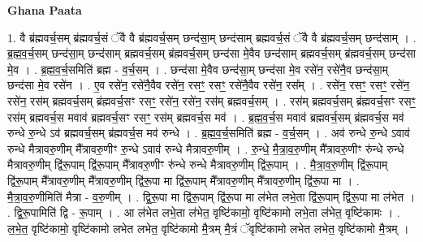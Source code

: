 \documentclass[17pt]{extarticle}
\begin{document}
\textbf{Ghana Paata } \newline

1. वै ब्र॑ह्मवर्च॒सम् ब्र॑ह्मवर्च॒सं ॅवै वै ब्र॑ह्मवर्च॒सम् छन्द॑सा॒म् छन्द॑साम् ब्रह्मवर्च॒सं ॅवै वै ब्र॑ह्मवर्च॒सम् छन्द॑साम् । . ब्र॒ह्म॒व॒र्च॒सम् छन्द॑सा॒म् छन्द॑साम् ब्रह्मवर्च॒सम् ब्र॑ह्मवर्च॒सम् छन्द॑सा मे॒वैव छन्द॑साम् ब्रह्मवर्च॒सम् ब्र॑ह्मवर्च॒सम् छन्द॑सा मे॒व । . ब्र॒ह्म॒व॒र्च॒समिति॑ ब्रह्म - व॒र्च॒सम् । . छन्द॑सा मे॒वैव छन्द॑सा॒म् छन्द॑सा मे॒व रसे॑न॒ रसे॑नै॒व छन्द॑सा॒म् छन्द॑सा मे॒व रसे॑न । . ए॒व रसे॑न॒ रसे॑नै॒वैव रसे॑न॒ रसꣳ॒॒ रसꣳ॒॒ रसे॑नै॒वैव रसे॑न॒ रस᳚म् । . रसे॑न॒ रसꣳ॒॒ रसꣳ॒॒ रसे॑न॒ रसे॑न॒ रस॑म् ब्रह्मवर्च॒सम् ब्र॑ह्मवर्च॒सꣳ रसꣳ॒॒ रसे॑न॒ रसे॑न॒ रस॑म् ब्रह्मवर्च॒सम् । . रस॑म् ब्रह्मवर्च॒सम् ब्र॑ह्मवर्च॒सꣳ रसꣳ॒॒ रस॑म् ब्रह्मवर्च॒स मवाव॑ ब्रह्मवर्च॒सꣳ रसꣳ॒॒ रस॑म् ब्रह्मवर्च॒स मव॑ । . ब्र॒ह्म॒व॒र्च॒स मवाव॑ ब्रह्मवर्च॒सम् ब्र॑ह्मवर्च॒स मव॑ रुन्धे रु॒न्धे ऽव॑ ब्रह्मवर्च॒सम् ब्र॑ह्मवर्च॒स मव॑ रुन्धे । . ब्र॒ह्म॒व॒र्च॒समिति॑ ब्रह्म - व॒र्च॒सम् । . अव॑ रुन्धे रु॒न्धे ऽवाव॑ रुन्धे मैत्रावरु॒णीम् मै᳚त्रावरु॒णीꣳ रु॒न्धे ऽवाव॑ रुन्धे मैत्रावरु॒णीम् । . रु॒न्धे॒ मै॒त्रा॒व॒रु॒णीम् मै᳚त्रावरु॒णीꣳ रु॑न्धे रुन्धे मैत्रावरु॒णीम् द्वि॑रू॒पाम् द्वि॑रू॒पाम् मै᳚त्रावरु॒णीꣳ रु॑न्धे रुन्धे मैत्रावरु॒णीम् द्वि॑रू॒पाम् । . मै॒त्रा॒व॒रु॒णीम् द्वि॑रू॒पाम् द्वि॑रू॒पाम् मै᳚त्रावरु॒णीम् मै᳚त्रावरु॒णीम् द्वि॑रू॒पा मा द्वि॑रू॒पाम् मै᳚त्रावरु॒णीम् मै᳚त्रावरु॒णीम् द्वि॑रू॒पा मा । . मै॒त्रा॒व॒रु॒णीमिति॑ मैत्रा - व॒रु॒णीम् । . द्वि॒रू॒पा मा द्वि॑रू॒पाम् द्वि॑रू॒पा मा ल॑भेत लभे॒ता द्वि॑रू॒पाम् द्वि॑रू॒पा मा ल॑भेत । . द्वि॒रू॒पामिति॑ द्वि - रू॒पाम् । . आ ल॑भेत लभे॒ता ल॑भेत॒ वृष्टि॑कामो॒ वृष्टि॑कामो लभे॒ता ल॑भेत॒ वृष्टि॑कामः । . ल॒भे॒त॒ वृष्टि॑कामो॒ वृष्टि॑कामो लभेत लभेत॒ वृष्टि॑कामो मै॒त्रम् मै॒त्रं ॅवृष्टि॑कामो लभेत लभेत॒ वृष्टि॑कामो मै॒त्रम् । \newline
\end{document}
